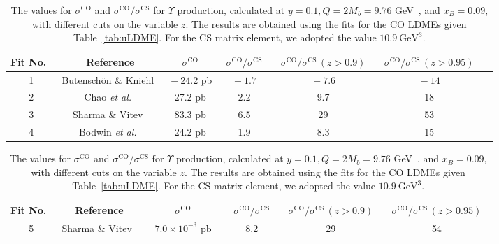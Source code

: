 \documentclass[prd,aps,preprintnumbers,nofootinbib,superscriptaddress]{revtex4}
\newcommand{\xB}{x_{\scriptscriptstyle B}}
\begin{document}
\begin{table}[t]
\begin{centering}
\begin{tabular}{|c|c|c|c|c|c|c|}
\hline 
Fit No.\ & Reference & $~~~~~\sigma^\text{CO}~~~~~$ & $~~\sigma^\text{CO}/\sigma^\text{CS}~~$& $~~\sigma^\text{CO}/\sigma^\text{CS} \,(z>0.9)~~$ & $~~\sigma^\text{CO}/\sigma^\text{CS}\, (z>0.95)~~$  \tabularnewline
\hline 
\hline 
1 & Butensch\"on \& Kniehl~\cite{Butenschoen:2010rq}
& $\!\!\!-\!24.2$ pb& $\!\!\!\! -1.7$ & $\!\!\!\! -7.6$ & $\!\!\!\! -14$\tabularnewline
2 & Chao {\it et al.}~\cite{Chao:2012iv} 
& 27.2 pb & 2.2 & 9.7  & 18 \tabularnewline
3 & Sharma \& Vitev~\cite{Sharma:2012dy} & 83.3 pb  & 6.5 & 29 & 53 \tabularnewline
4 & Bodwin {\it et al.}~\cite{Bodwin:2014gia}
& 24.2 pb &   1.9  & 8.3& 15\tabularnewline
\hline
\end{tabular}
\par\end{centering}
\caption{The values for $\sigma^\text{CO}$ and $\sigma^\text{CO}/\sigma^\text{CS}$ for $J/\psi$ production, calculated at $y = 0.1, Q=2 M_c = 3$  GeV and $\xB = 0.01$, with different cuts on the variable $z$. The results are obtained using the fits for the CO LDMEs given in Table~\ref{tab:jpsiLDME}. For the CS matrix element, we adopted the values $1.32~ \text{GeV}^3$  (fit 1), $1.16~ \text{GeV}^3$ (fit 2), and $1.2~ \text{GeV}^3$ (fits $3,4$).}
\label{tab:CS-CO}
\vspace{0.4cm}
%
\begin{centering}
\begin{tabular}{|c|c|c|c|c|c|}
\hline 
Fit No.\ & Reference & $~~~~~\sigma^\text{CO}~~~~~$ & $~~\sigma^\text{CO}/\sigma^\text{CS}~~$& $~~\sigma^\text{CO}/\sigma^\text{CS} \,(z>0.9)~~$ & $~~\sigma^\text{CO}/\sigma^\text{CS}\, (z>0.95)~~$ 
 \tabularnewline
\hline  
\hline 
5 & Sharma \& Vitev~\cite{Sharma:2012dy}&~ $7.0\times 10^{-3}$ pb ~& 8.2 & 29 & 54 \tabularnewline
\hline 
\end{tabular}
\par\end{centering}
\caption{The values for $\sigma^\text{CO}$ and $\sigma^\text{CO}/\sigma^\text{CS}$ for $\Upsilon$ production, calculated at $y = 0.1, Q=2 M_b = 9.76$  GeV~\cite{Sharma:2012dy}, and $\xB = 0.09$, with different cuts on the variable $z$. The results are obtained using the fits for the CO LDMEs given Table~\ref{tab:uLDME}. For the CS matrix element, we adopted the value $10.9~\text{GeV}^3$.}
\label{tab:CS-CO-ups}
\end{table}
\end{document}
